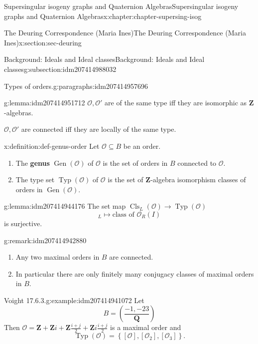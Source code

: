 \documentclass[oneside,10pt,]{book}
\newcommand{\terminology}[1]{\textbf{#1}}
\numberwithin{equation}{section}
\newcommand{\legendre}[2]{\left(\frac{#1}{#2}\right)}
\newcommand{\lb}{[}
\newcommand{\rb}{]}
\newcommand{\ZZ}{\mathbf{Z}}
\newcommand{\QQ}{\mathbf{Q}}
\newcommand{\ints}{\mathcal{O}}
\begin{document}
\begin{chapterptx}{Supersingular isogeny graphs and Quaternion Algebras}{}{Supersingular isogeny graphs and Quaternion Algebras}{}{}{x:chapter:chapter-supersing-isog}
\begin{sectionptx}{The Deuring Correspondence (Maria Ines)}{}{The Deuring Correspondence (Maria Ines)}{}{}{x:section:sec-deuring}
\begin{subsectionptx}{Background: Ideals and Ideal classes}{}{Background: Ideals and Ideal classes}{}{}{g:subsection:idm207414988032}
\begin{paragraphs}{Types of orders.}{g:paragraphs:idm207414957696}
\begin{lemma}{}{}{g:lemma:idm207414951712}
\(\ints,\ints'\) are of the same type iff they are isomorphic as \(\ZZ\)-algebras.%
\par
\(\ints,\ints'\) are connected iff they are locally of the same type.%
\end{lemma}
\begin{definition}{}{x:definition:def-genus-order}%
Let \(\ints \subseteq B\) be an order.%
\begin{enumerate}
\item{}The \terminology{genus} \(\operatorname{Gen}(\ints)\) of \(\ints \) is the set of orders in \(B \) connected to \(\ints\).%
\item{}The type set \(\operatorname{Typ}(\ints)\) of \(\ints\) is the set of \(\ZZ\)-algebra isomorphism classes of orders in \(\operatorname{Gen} (\ints)\).%
\end{enumerate}
%
\end{definition}
\begin{lemma}{}{}{g:lemma:idm207414944176}%
The set map \(\operatorname{Cls}_L(\ints) \to \operatorname{Typ}(\ints)\)%
\begin{equation*}
[ I]_L \mapsto \text{class of } \ints_R(I)
\end{equation*}
is surjective.%
\end{lemma}
\begin{remark}{}{g:remark:idm207414942880}%
%
\begin{enumerate}
\item{}Any two maximal orders in \(B\) are connected.%
\item{}In particular there are only finitely many conjugacy classes of maximal orders in \(B\).%
\end{enumerate}
%
\end{remark}
\begin{example}{Voight 17.6.3.}{g:example:idm207414941072}%
Let%
\begin{equation*}
B = \legendre{-1,-23}{\QQ}
\end{equation*}
Then \(\ints=  \ZZ +  \ZZ i + \ZZ \frac{i+j}{2} + \ZZ i \frac{i+j}{2}\) is a maximal order and%
\begin{equation*}
\operatorname{Typ}(\ints) =  \left\{ \lb \ints \rb , \lb \ints_2 \rb , \lb \ints_3 \rb \right\}\text{.}
\end{equation*}
%
\end{example}
\end{paragraphs}%
\end{subsectionptx}
%
%
\typeout{************************************************}

\end{sectionptx}
\end{chapterptx}
\end{document}
